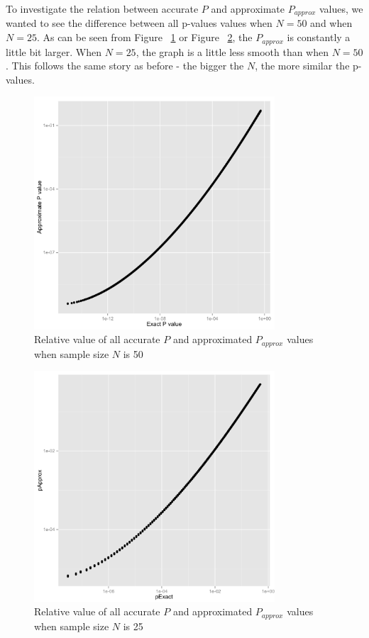 \documentclass[12pt]{article}
\begin{document}
{\newpage

To investigate the relation between accurate $P$ and approximate $P_{approx}$ values, we wanted to see the difference between all p-values values when $N = 50$ and when $N = 25$. As can be seen from Figure ~\ref{fig:PvsP50} or Figure ~\ref{fig:PvsP25}, the $P_{approx}$
is constantly a little bit larger. When $N = 25$, the graph is a little less smooth than when $N=50$. This follows the same story as before - the bigger the $N$, the more similar the p-values.

\begin{figure}[H]
  \centering
  \includegraphics[width=0.8\textwidth]{PvsP50}
  \caption{Relative value of all accurate $P$ and approximated $P_{approx}$ values when sample size $N$ is 50}
  \label{fig:PvsP50}
\end{figure}

\begin{figure}[H]
  \centering
  \includegraphics[width=0.8\textwidth]{PvsP25}
  \caption{Relative value of all accurate $P$ and approximated $P_{approx}$ values when sample size $N$ is 25}
  \label{fig:PvsP25}
\end{figure}

}
\end{document}
